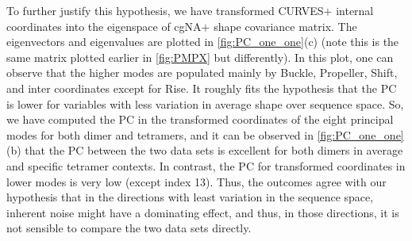 To further justify this hypothesis, we have transformed CURVES$+$ internal coordinates into the eigenspace of cgNA$+$ shape covariance matrix. 
The eigenvectors and eigenvalues are plotted in \cref{fig:PC_one_one}(c) (note this is the same matrix plotted earlier in \cref{fig:PMPX} but differently).
In this plot, one can observe that the higher modes are populated mainly by Buckle, Propeller, Shift, and inter coordinates except for Rise. 
It roughly fits the hypothesis that the PC is lower for variables with less variation in average shape over sequence space. 
So, we have computed the PC in the transformed coordinates of the eight principal modes for both dimer and tetramers, and it can be observed in  \cref{fig:PC_one_one}(b) that the PC between the two data sets is excellent for both dimers in average and specific tetramer contexts. 
In contrast, the PC for transformed coordinates in lower modes is very low (except index 13).
Thus, the outcomes agree with our hypothesis that in the directions with least variation in the sequence space, inherent noise might have a dominating effect, and thus, in those directions, it is not sensible to compare the two data sets directly.

